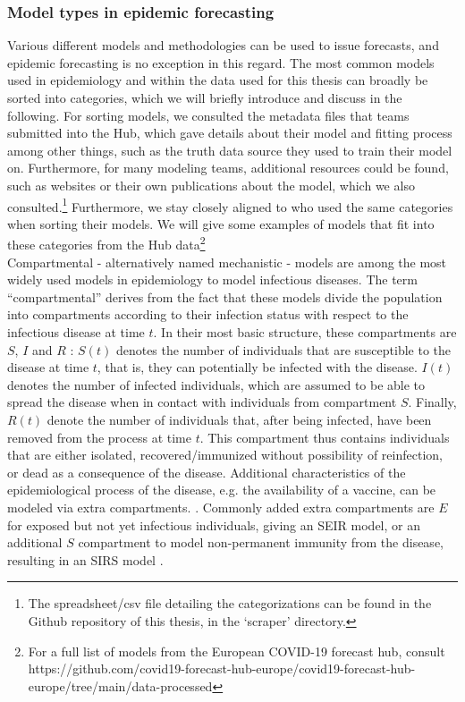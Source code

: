 \subsubsection{Model types in epidemic forecasting}
Various different models and methodologies can be used to issue forecasts, and epidemic forecasting is no exception in this regard. The most common models used in epidemiology and within the data used for this thesis can broadly be sorted into categories, which we will briefly introduce and discuss in the following. For sorting models, we consulted the metadata files that teams submitted into the Hub, which gave details about their model and fitting process among other things, such as the truth data source they used to train their model on. Furthermore, for many modeling teams, additional resources could be found, such as websites or their own publications about the model, which we also consulted.\footnote{The spreadsheet/csv file detailing the categorizations can be found in the Github repository of this thesis, in the `scraper' directory.} %
Furthermore, we stay closely aligned to \cite{bracher_pre-registered_2021} who used the same categories when sorting their models. We will give some examples of models that fit into these categories from the Hub data\footnote{For a full list of models from the European COVID-19 forecast hub, consult https://github.com/covid19-forecast-hub-europe/covid19-forecast-hub-europe/tree/main/data-processed}\\
Compartmental - alternatively named mechanistic - models are among the most widely used models in epidemiology to model infectious diseases. The term ``compartmental'' derives from the fact that these models divide the population into compartments according to their infection status with respect to the infectious disease at time $t$. In their most basic structure, these compartments are $S$, $I$ and $R$ \citep{brauer_epidemic_2012}: $S(t)$ denotes the number of individuals that are susceptible to the disease at time $t$, that is, they can potentially be infected with the disease. $I(t)$ denotes the number of infected individuals, which are assumed to be able to spread the disease when in contact with individuals from compartment $S$. Finally, $R(t)$ denote the number of individuals that, after being infected, have been removed from the process at time $t$. This compartment thus contains individuals that are either isolated, recovered/immunized without possibility of reinfection, or dead as a consequence of the disease. Additional characteristics of the epidemiological process of the disease, e.g. the availability of a vaccine, can be modeled via extra compartments. . Commonly added extra compartments are $E$ for exposed but not yet infectious individuals, giving an SEIR model, or an additional $S$ compartment to model non-permanent immunity from the disease, resulting in an SIRS model \citep{brauer_epidemic_2012}. \\
